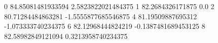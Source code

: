 0 84.85081481933594 2.5823822021484375
1 82.2684326171875 0.0
2 80.71284484863281 -1.5555877685546875
4 81.19509887695312 -1.073333740234375
6 82.12968444824219 -0.1387481689453125
8 82.58982849121094 0.3213958740234375
